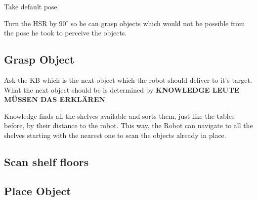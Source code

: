 \documentclass[main.tex]{subfiles}
\begin{document}
	Take default pose.
	
	
	
	Turn the HSR by $90^\circ$ so he can grasp objects which would not be possible from the pose he took to perceive the objects.
	
	\subsection{Grasp Object}
	
	Ask the KB which is the next object which the robot should deliver to it's target. What the next object should be is determined by \textbf{KNOWLEDGE LEUTE MÜSSEN DAS ERKLÄREN}
	
	
	
	
	
Knowledge finds all the shelves available and sorts them, just like the tables before, by their distance to the robot. This way, the Robot can navigate to all the shelves starting with the nearest one to scan the objects already in place.
	
	
	\subsection{Scan shelf floors}
	
	
	
	
	
	
	\subsection{Place Object}
	
	
	
	
\end{document}
